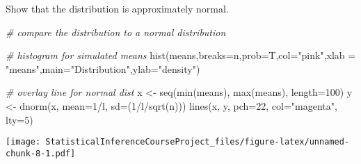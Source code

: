 \documentclass[
]{article}
\newenvironment{Shaded}{\begin{snugshade}}{\end{snugshade}}
\newcommand{\AttributeTok}[1]{\textcolor[rgb]{0.77,0.63,0.00}{#1}}
\newcommand{\CommentTok}[1]{\textcolor[rgb]{0.56,0.35,0.01}{\textit{#1}}}
\newcommand{\DecValTok}[1]{\textcolor[rgb]{0.00,0.00,0.81}{#1}}
\newcommand{\FunctionTok}[1]{\textcolor[rgb]{0.00,0.00,0.00}{#1}}
\newcommand{\NormalTok}[1]{#1}
\newcommand{\OtherTok}[1]{\textcolor[rgb]{0.56,0.35,0.01}{#1}}
\newcommand{\SpecialCharTok}[1]{\textcolor[rgb]{0.00,0.00,0.00}{#1}}
\newcommand{\StringTok}[1]{\textcolor[rgb]{0.31,0.60,0.02}{#1}}
\begin{document}
Show that the distribution is approximately normal.

\begin{Shaded}
\begin{Highlighting}[]
\CommentTok{\# compare the distribution to a normal distribution}

\CommentTok{\# histogram for simulated means}
\FunctionTok{hist}\NormalTok{(means,}\AttributeTok{breaks=}\NormalTok{n,}\AttributeTok{prob=}\NormalTok{T,}\AttributeTok{col=}\StringTok{"pink"}\NormalTok{,}\AttributeTok{xlab =} \StringTok{"means"}\NormalTok{,}\AttributeTok{main=}\StringTok{"Distribution"}\NormalTok{,}\AttributeTok{ylab=}\StringTok{"density"}\NormalTok{)}

\CommentTok{\# overlay line for normal dist}
\NormalTok{x }\OtherTok{\textless{}{-}} \FunctionTok{seq}\NormalTok{(}\FunctionTok{min}\NormalTok{(means), }\FunctionTok{max}\NormalTok{(means), }\AttributeTok{length=}\DecValTok{100}\NormalTok{)}
\NormalTok{y }\OtherTok{\textless{}{-}} \FunctionTok{dnorm}\NormalTok{(x, }\AttributeTok{mean=}\DecValTok{1}\SpecialCharTok{/}\NormalTok{l, }\AttributeTok{sd=}\NormalTok{(}\DecValTok{1}\SpecialCharTok{/}\NormalTok{l}\SpecialCharTok{/}\FunctionTok{sqrt}\NormalTok{(n)))}
\FunctionTok{lines}\NormalTok{(x, y, }\AttributeTok{pch=}\DecValTok{22}\NormalTok{, }\AttributeTok{col=}\StringTok{"magenta"}\NormalTok{, }\AttributeTok{lty=}\DecValTok{5}\NormalTok{)}
\end{Highlighting}
\end{Shaded}

\texttt{[image: StatisticalInferenceCourseProject\_files/figure-latex/unnamed-chunk-8-1.pdf]}
\end{document}
